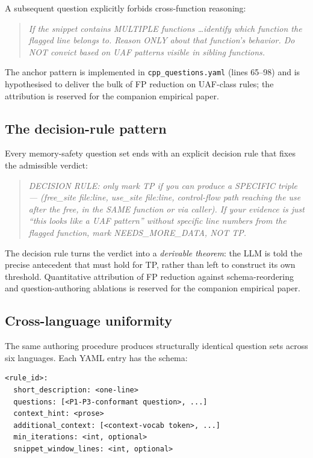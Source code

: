 \documentclass[11pt,a4paper]{article}
\begin{document}
A subsequent question explicitly forbids cross-function reasoning:

\begin{quote}
\emph{If the snippet contains MULTIPLE functions \ldots identify which
function the flagged line belongs to. Reason ONLY about that function's
behavior. Do NOT convict based on UAF patterns visible in sibling
functions.}
\end{quote}

The anchor pattern is implemented in \texttt{cpp\_questions.yaml}
(lines 65--98) and is hypothesised to deliver the bulk of FP reduction
on UAF-class rules; the attribution is reserved for the companion
empirical paper.

\subsection{The decision-rule pattern}
\label{sec:decision-rule}

Every memory-safety question set ends with an explicit decision rule
that fixes the admissible verdict:

\begin{quote}
\emph{DECISION RULE: only mark TP if you can produce a SPECIFIC triple
--- (free\_site file:line, use\_site file:line, control-flow path
reaching the use after the free, in the SAME function or via caller).
If your evidence is just ``this looks like a UAF pattern'' without
specific line numbers from the flagged function, mark
NEEDS\_MORE\_DATA, NOT TP.}
\end{quote}

The decision rule turns the verdict into a \emph{derivable theorem}:
the LLM is told the precise antecedent that must hold for TP, rather
than left to construct its own threshold. Quantitative attribution of
FP reduction against schema-reordering and question-authoring ablations
is reserved for the companion empirical paper.

\subsection{Cross-language uniformity}

The same authoring procedure produces structurally identical question
sets across six languages. Each YAML entry has the schema:

\begin{lstlisting}[language=yamlex]
<rule_id>:
  short_description: <one-line>
  questions: [<P1-P3-conformant question>, ...]
  context_hint: <prose>
  additional_context: [<context-vocab token>, ...]
  min_iterations: <int, optional>
  snippet_window_lines: <int, optional>
\end{lstlisting}
\end{document}
